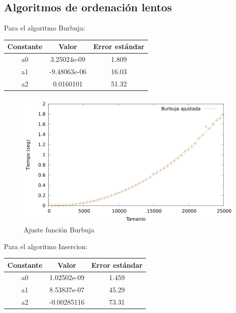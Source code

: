 \documentclass{article}
\begin{document}
	\subsection{Algoritmos de ordenación lentos}


Para el algoritmo Burbuja:

	\begin{longtable}{|c|c|c|}
		\hline
		Constante		& Valor			& Error estándar	\\ \hline
		a0              & 3.25024e-09	& 1.809 \\ \hline
		a1              & -9.48063e-06	& 16.03 \\ \hline
		a2              & 0.0160101		& 51.32 \\ \hline
	\end{longtable}

	\begin{figure}[h]
		\centering
		\includegraphics[totalheight=8cm]{img/Burbuja_ajustada}
		\caption{Ajuste función Burbuja}
		\label{fig:Burbuja_ajustada}
	\end{figure}

Para el algoritmo Insercion:

	\begin{longtable}{|c|c|c|}
		\hline
		Constante		& Valor			& Error estándar	\\ \hline
		a0              & 1.02502e-09	& 1.459 \\ \hline
		a1              & 8.53837e-07	& 45.29 \\ \hline
		a2              & -0.00285116	& 73.31 \\ \hline
	\end{longtable}
\end{document}
